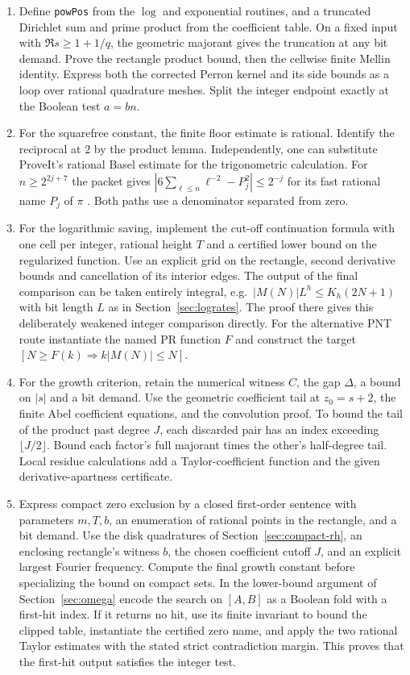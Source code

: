 \begin{enumerate}
\item Define \texttt{powPos} from the $\log$ and exponential routines, and a truncated Dirichlet sum and prime product from the coefficient table. On a fixed input with $\Re s\ge1+1/q$, the geometric majorant gives the truncation at any bit demand. Prove the rectangle product bound, then the cellwise finite Mellin identity. Express both the corrected Perron kernel and its side bounds as a loop over rational quadrature meshes. Split the integer endpoint exactly at the Boolean test $a=bn$.
\item For the squarefree constant, the finite floor estimate is rational. Identify the reciprocal at $2$ by the product lemma. Independently, one can substitute ProveIt's rational Basel estimate for the trigonometric calculation. For $n\ge 2^{2j+7}$ the packet gives $|6\sum_{\ell\le n}\ell^{-2}-P_j^2|\le2^{-j}$ for its fast rational name $P_j$ of $\pi$ \cite{basel}. Both paths use a denominator separated from zero.
\item For the logarithmic saving, implement the cut-off continuation formula with one cell per integer, rational height $T$ and a certified lower bound on the regularized function. Use an explicit grid on the rectangle, second derivative bounds and cancellation of its interior edges. The output of the final comparison can be taken entirely integral, e.g.\ $|M(N)|L^h\le K_h(2N+1)$ with bit length $L$ as in Section~\ref{sec:logrates}. The proof there gives this deliberately weakened integer comparison directly. For the alternative PNT route instantiate the named PR function $F$ and construct the target $[N\ge F(k)\Rightarrow k|M(N)|\le N]$.
\item For the growth criterion, retain the numerical witness $C$, the gap $\Delta$, a bound on $|s|$ and a bit demand. Use the geometric coefficient tail at $z_0=s+2$, the finite Abel coefficient equations, and the convolution proof. To bound the tail of the product past degree $J$, each discarded pair has an index exceeding $\lfloor J/2\rfloor$. Bound each factor's full majorant times the other's half-degree tail. Local residue calculations add a Taylor-coefficient function and the given derivative-apartness certificate.
\item Express compact zero exclusion by a closed first-order sentence with parameters $m,T,b$, an enumeration of rational points in the rectangle, and a bit demand. Use the disk quadratures of Section~\ref{sec:compact-rh}, an enclosing rectangle's witness $b$, the chosen coefficient cutoff $J$, and an explicit largest Fourier frequency. Compute the final growth constant before specializing the bound on compact sets. In the lower-bound argument of Section~\ref{sec:omega} encode the search on $[A,B]$ as a Boolean fold with a first-hit index. If it returns no hit, use its finite invariant to bound the clipped table, instantiate the certified zero name, and apply the two rational Taylor estimates with the stated strict contradiction margin. This proves that the first-hit output satisfies the integer test.
\end{enumerate}

